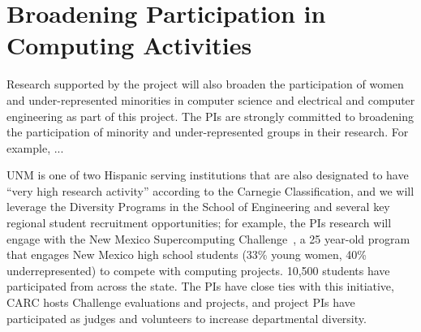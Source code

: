 \section{Broadening Participation in Computing Activities}
Research supported by the project will also broaden the participation of women and under-represented
minorities in computer science and electrical and computer engineering
as part of this project. The PIs are strongly committed to broadening the
participation of minority and under-represented groups in their research. 
For example, ...

UNM is one of two Hispanic serving institutions that are also designated
to have ``very high research activity''
according to the Carnegie Classification, and we will leverage the Diversity
Programs in the School of Engineering and several key regional student
recruitment opportunities; for example, the PIs research will engage with the New Mexico
Supercomputing Challenge~\cite{NMChallenge}, a 25 year-old program that
engages New Mexico high school students (33\% young women, 40\% underrepresented)
to compete with computing projects.  10,500 students have participated from across the state. The
PIs have close ties with this initiative, CARC hosts Challenge evaluations and projects,
and project PIs have participated as judges and volunteers to increase departmental diversity.
